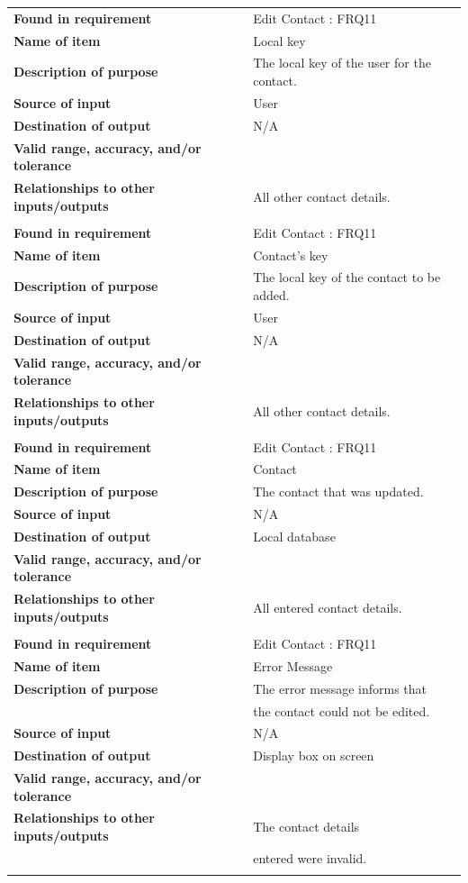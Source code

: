 \newpage
\begin{tabular}{ll}
\textbf{Found in requirement}&Edit Contact : FRQ11\\
\textbf{Name of item}&Local key\\
\textbf{Description of purpose}&The local key of the user for the contact.\\
\textbf{Source of input}&User\\
\textbf{Destination of output}&N/A\\
\textbf{Valid range, accuracy, and/or tolerance}&\\
\textbf{Relationships to other inputs/outputs}&All other contact details.\\
&\\
\textbf{Found in requirement}&Edit Contact : FRQ11\\
\textbf{Name of item}&Contact's key\\
\textbf{Description of purpose}&The local key of the contact to be added.\\
\textbf{Source of input}&User\\
\textbf{Destination of output}&N/A\\
\textbf{Valid range, accuracy, and/or tolerance}&\\
\textbf{Relationships to other inputs/outputs}&All other contact details.\\
&\\
\textbf{Found in requirement}&Edit Contact : FRQ11\\
\textbf{Name of item}&Contact\\
\textbf{Description of purpose}&The contact that was updated.\\
\textbf{Source of input}&N/A\\
\textbf{Destination of output}&Local database\\
\textbf{Valid range, accuracy, and/or tolerance}&\\
\textbf{Relationships to other inputs/outputs}&All entered contact details.\\
&\\
\textbf{Found in requirement}&Edit Contact : FRQ11\\
\textbf{Name of item}&Error Message\\
\textbf{Description of purpose}&The error message informs that \\&the contact could not be edited.\\
\textbf{Source of input}&N/A\\
\textbf{Destination of output}&Display box on screen\\
\textbf{Valid range, accuracy, and/or tolerance}&\\
\textbf{Relationships to other inputs/outputs}&The contact details \\& entered were invalid.\\
&\\
\end{tabular}

